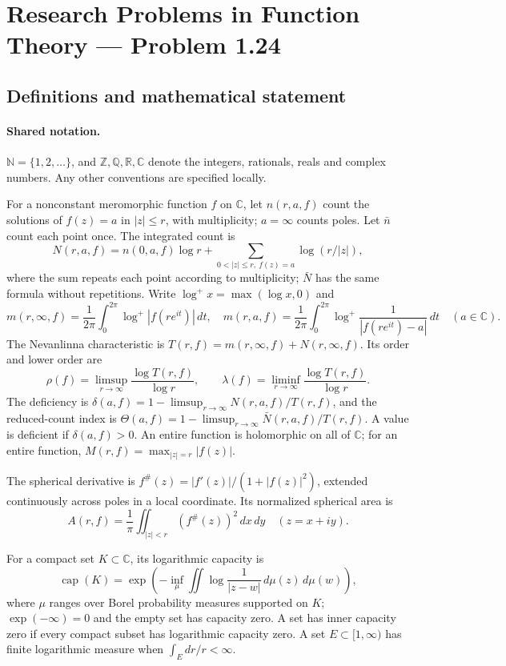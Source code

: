 \documentclass[11pt]{article}
\begin{document}
\section{Research Problems in Function Theory — Problem 1.24}\label{statement}

\subsection{Definitions and mathematical statement}

\paragraph{Shared notation.}$\mathbb N=\{1,2,\ldots\}$, and $\mathbb Z,\mathbb Q,\mathbb R,\mathbb C$ denote the integers, rationals, reals and complex numbers. Any other conventions are specified locally.


For a nonconstant meromorphic function $f$ on $\mathbb C$, let $n(r,a,f)$ count the solutions of $f(z)=a$ in $|z|\le r$, with multiplicity; $a=\infty$ counts poles. Let $\bar n$ count each point once. The integrated count is
\[
 N(r,a,f)=n(0,a,f)\log r+\sum_{0<|z|\le r,\ f(z)=a}\log(r/|z|),
\]
where the sum repeats each point according to multiplicity; $\bar N$ has the same formula without repetitions. Write $\log^+x=\max(\log x,0)$ and
\[
 m(r,\infty,f)=\frac1{2\pi}\int_0^{2\pi}\log^+|f(re^{it})|\,dt,\quad
 m(r,a,f)=\frac1{2\pi}\int_0^{2\pi}\log^+\frac1{|f(re^{it})-a|}\,dt\quad(a\in\mathbb C).
\]
The Nevanlinna characteristic is $T(r,f)=m(r,\infty,f)+N(r,\infty,f)$. Its order and lower order are
\[
 \rho(f)=\limsup_{r\to\infty}\frac{\log T(r,f)}{\log r},\qquad
 \lambda(f)=\liminf_{r\to\infty}\frac{\log T(r,f)}{\log r}.
\]
The deficiency is $\delta(a,f)=1-\limsup_{r\to\infty}N(r,a,f)/T(r,f)$, and the reduced-count index is $\Theta(a,f)=1-\limsup_{r\to\infty}\bar N(r,a,f)/T(r,f)$. A value is deficient if $\delta(a,f)>0$. An entire function is holomorphic on all of $\mathbb C$; for an entire function, $M(r,f)=\max_{|z|=r}|f(z)|$.

The spherical derivative is $f^\#(z)=|f'(z)|/(1+|f(z)|^2)$, extended continuously across poles in a local coordinate. Its normalized spherical area is
\[
 A(r,f)=\frac1\pi\iint_{|z|<r}(f^\#(z))^2\,dx\,dy\quad(z=x+iy).
\]

For a compact set $K\subset\mathbb C$, its logarithmic capacity is
\[
 \operatorname{cap}(K)=\exp\!\left(-\inf_\mu\iint\log\frac1{|z-w|}\,d\mu(z)\,d\mu(w)\right),
\]
where $\mu$ ranges over Borel probability measures supported on $K$; $\exp(-\infty)=0$ and the empty set has capacity zero. A set has inner capacity zero if every compact subset has logarithmic capacity zero. A set $E\subset[1,\infty)$ has finite logarithmic measure when $\int_E dr/r<\infty$.
\end{document}
